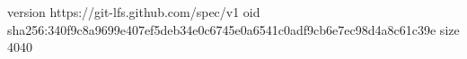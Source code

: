 version https://git-lfs.github.com/spec/v1
oid sha256:340f9c8a9699e407ef5deb34e0c6745e0a6541c0adf9cb6e7ec98d4a8c61c39e
size 4040
